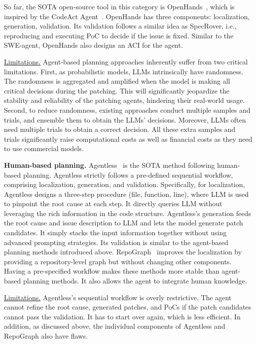 So far, the SOTA open-source tool in this category is OpenHands~\cite{wang2024openhands}, which is inspired by the CodeAct Agent~\cite{wang2024executable}. 
OpenHands has three components: localization, generation, validation. 
Its validation follows a similar idea as SpecRover, i.e., reproducing and executing PoC to decide if the issue is fixed. 
Similar to the SWE-agent, OpenHands also designs an ACI for the agent.

\noindent\underline{Limitations.}
Agent-based planning approaches inherently suffer from two critical limitations. 
First, as probabilistic models, LLMs intrinsically have randomness. 
The randomness is aggregated and amplified when the model is making all critical decisions during the patching. 
This will significantly jeopardize the stability and reliability of the patching agents, hindering their real-world usage. 
Second, to reduce randomness, existing approaches conduct multiple samples and trials, and ensemble them to obtain the LLMs' decisions.
Moreover, LLMs often need multiple trials to obtain a correct decision. 
All these extra samples and trials significantly raise computational costs as well as financial costs as they need to use commercial models.  


\noindent\textbf{Human-based planning.}
Agentless~\cite{xia2024agentless} is the SOTA method following human-based planning. 
Agentless strictly follows a pre-defined sequential workflow, comprising localization, generation, and validation.
Specifically, for localization, Agentless designs a three-step procedure (file, function, line), where LLM is used to pinpoint the root cause at each step.
It directly queries LLM without leveraging the rich information in the code structure. 
Agentless's generation feeds the root cause and issue description to LLM and lets the model generate patch candidates.
It simply stacks the input information together without using advanced prompting strategies.
Its validation is similar to the agent-based planning methods introduced above.
RepoGraph~\cite{ouyang2024repograph} improves the localization by providing a repository-level graph but without changing other components. 
Having a pre-specified workflow makes these methods more stable than agent-based planning methods.
It also allows the agent to integrate human knowledge. 

\noindent\underline{Limitations.}
Agentless's sequential workflow is overly restrictive. 
The agent cannot refine the root cause, generated patches, and PoCs if the patch candidates cannot pass the validation.
It has to start over again, which is less efficient. 
In addition, as discussed above, the individual components of Agentless and RepoGraph also have flaws. 


